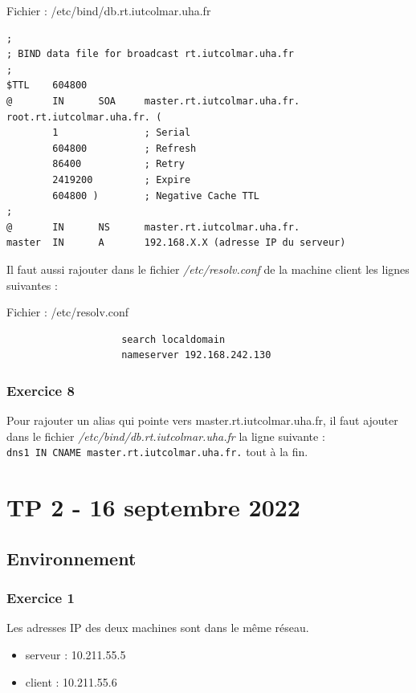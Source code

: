 \documentclass[12pt, a4paper]{article}
\begin{document}
        \begin{listing}[H]
            \caption{Fichier : /etc/bind/db.rt.iutcolmar.uha.fr}
            \label{lst:bind}
            \begin{verbatim}
;
; BIND data file for broadcast rt.iutcolmar.uha.fr
;
$TTL    604800
@       IN      SOA     master.rt.iutcolmar.uha.fr. root.rt.iutcolmar.uha.fr. (
        1               ; Serial
        604800          ; Refresh
        86400           ; Retry
        2419200         ; Expire
        604800 )        ; Negative Cache TTL
;
@       IN      NS      master.rt.iutcolmar.uha.fr.
master  IN      A       192.168.X.X (adresse IP du serveur)
            \end{verbatim}
        \end{listing}

        Il faut aussi rajouter dans le fichier \textit{/etc/resolv.conf} de la machine
        client les lignes suivantes :

        \begin{listing}[H]
            \caption{Fichier : /etc/resolv.conf}
            \label{lst:resolv}
            \begin{verbatim}
                    search localdomain
                    nameserver 192.168.242.130
            \end{verbatim}
        \end{listing}

        \subsubsection{Exercice 8}
        Pour rajouter un alias qui pointe vers master.rt.iutcolmar.uha.fr, il faut
        ajouter dans le fichier \textit{/etc/bind/db.rt.iutcolmar.uha.fr} la ligne suivante :\\
        \texttt{dns1 IN CNAME master.rt.iutcolmar.uha.fr.} tout à la fin. 

    
\newpage
\section{TP 2 - 16 septembre 2022}
    \subsection{Environnement}
        \subsubsection{Exercice 1}
        Les adresses IP des deux machines sont dans le même réseau. 
        \begin{itemize}
            \item serveur : 10.211.55.5
            \item client : 10.211.55.6
        \end{itemize}
    
\end{document}
